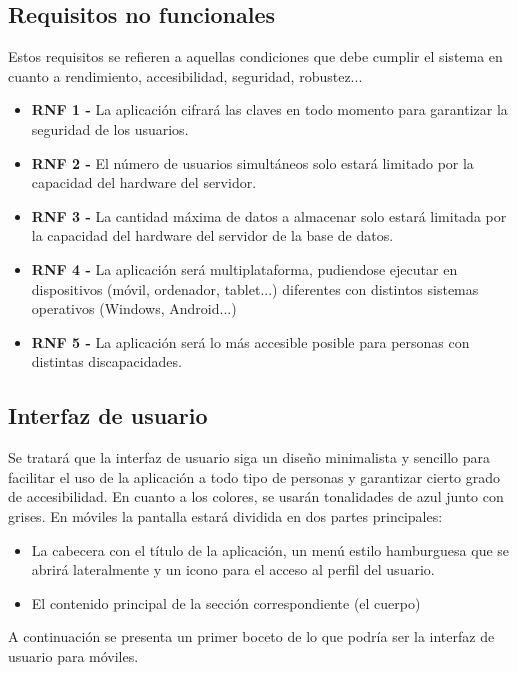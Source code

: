 \subsection{Requisitos no funcionales}
Estos requisitos se refieren a aquellas condiciones que debe cumplir el sistema en cuanto a rendimiento, accesibilidad, seguridad, robustez...
\begin{itemize}
    \item \textbf{RNF 1 - } La aplicación cifrará las claves en todo momento para garantizar la seguridad de los usuarios.
    \item \textbf{RNF 2 - } El número de usuarios simultáneos solo estará limitado por la capacidad del hardware del servidor.
    \item \textbf{RNF 3 - } La cantidad máxima de datos a almacenar solo estará limitada por la capacidad del hardware del servidor de la base de datos.
    \item \textbf{RNF 4 - } La aplicación será multiplataforma, pudiendose ejecutar en dispositivos (móvil, ordenador, tablet...) diferentes con distintos sistemas operativos (Windows, Android...)
    \item \textbf{RNF 5 - } La aplicación será lo más accesible posible para personas con distintas discapacidades. 
\end{itemize}



\subsection{Interfaz de usuario}
Se tratará que la interfaz de usuario siga un diseño minimalista y sencillo para facilitar el uso de la aplicación a todo tipo de personas y 
garantizar cierto grado de accesibilidad. En cuanto a los colores, se usarán tonalidades de azul junto con grises.
En móviles la pantalla estará dividida en dos partes principales: 
\begin{itemize}
    \item La cabecera con el título de la aplicación, un menú estilo hamburguesa que se abrirá lateralmente y un icono para el acceso al perfil del usuario.
    \item El contenido principal de la sección correspondiente (el cuerpo)
\end{itemize}

    A continuación se presenta un primer boceto de lo que podría ser la interfaz de usuario para móviles.

